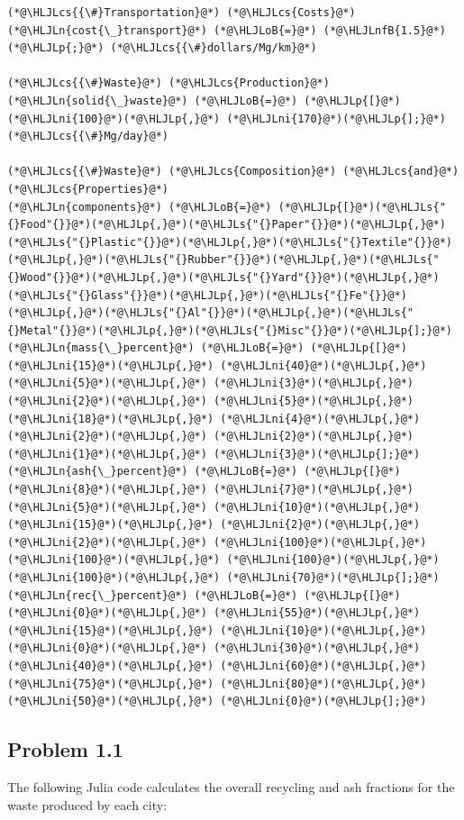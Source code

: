 \documentclass[12pt,a4paper]{article}
\newcommand{\HLJLn}[1]{#1}
\newcommand{\HLJLs}[1]{\textcolor[RGB]{201,61,57}{#1}}
\newcommand{\HLJLnfB}[1]{\textcolor[RGB]{59,151,46}{#1}}
\newcommand{\HLJLni}[1]{\textcolor[RGB]{59,151,46}{#1}}
\newcommand{\HLJLoB}[1]{\textcolor[RGB]{102,102,102}{\textbf{#1}}}
\newcommand{\HLJLp}[1]{#1}
\newcommand{\HLJLcs}[1]{\textcolor[RGB]{153,153,119}{\textit{#1}}}
\begin{document}
\begin{lstlisting}
(*@\HLJLcs{{\#}Transportation}@*) (*@\HLJLcs{Costs}@*)
(*@\HLJLn{cost{\_}transport}@*) (*@\HLJLoB{=}@*) (*@\HLJLnfB{1.5}@*)(*@\HLJLp{;}@*) (*@\HLJLcs{{\#}dollars/Mg/km}@*)

(*@\HLJLcs{{\#}Waste}@*) (*@\HLJLcs{Production}@*)
(*@\HLJLn{solid{\_}waste}@*) (*@\HLJLoB{=}@*) (*@\HLJLp{[}@*)(*@\HLJLni{100}@*)(*@\HLJLp{,}@*) (*@\HLJLni{170}@*)(*@\HLJLp{];}@*) (*@\HLJLcs{{\#}Mg/day}@*)

(*@\HLJLcs{{\#}Waste}@*) (*@\HLJLcs{Composition}@*) (*@\HLJLcs{and}@*) (*@\HLJLcs{Properties}@*)
(*@\HLJLn{components}@*) (*@\HLJLoB{=}@*) (*@\HLJLp{[}@*)(*@\HLJLs{"{}Food"{}}@*)(*@\HLJLp{,}@*)(*@\HLJLs{"{}Paper"{}}@*)(*@\HLJLp{,}@*)(*@\HLJLs{"{}Plastic"{}}@*)(*@\HLJLp{,}@*)(*@\HLJLs{"{}Textile"{}}@*)(*@\HLJLp{,}@*)(*@\HLJLs{"{}Rubber"{}}@*)(*@\HLJLp{,}@*)(*@\HLJLs{"{}Wood"{}}@*)(*@\HLJLp{,}@*)(*@\HLJLs{"{}Yard"{}}@*)(*@\HLJLp{,}@*)(*@\HLJLs{"{}Glass"{}}@*)(*@\HLJLp{,}@*)(*@\HLJLs{"{}Fe"{}}@*)(*@\HLJLp{,}@*)(*@\HLJLs{"{}Al"{}}@*)(*@\HLJLp{,}@*)(*@\HLJLs{"{}Metal"{}}@*)(*@\HLJLp{,}@*)(*@\HLJLs{"{}Misc"{}}@*)(*@\HLJLp{];}@*)
(*@\HLJLn{mass{\_}percent}@*) (*@\HLJLoB{=}@*) (*@\HLJLp{[}@*)(*@\HLJLni{15}@*)(*@\HLJLp{,}@*) (*@\HLJLni{40}@*)(*@\HLJLp{,}@*) (*@\HLJLni{5}@*)(*@\HLJLp{,}@*) (*@\HLJLni{3}@*)(*@\HLJLp{,}@*) (*@\HLJLni{2}@*)(*@\HLJLp{,}@*) (*@\HLJLni{5}@*)(*@\HLJLp{,}@*) (*@\HLJLni{18}@*)(*@\HLJLp{,}@*) (*@\HLJLni{4}@*)(*@\HLJLp{,}@*) (*@\HLJLni{2}@*)(*@\HLJLp{,}@*) (*@\HLJLni{2}@*)(*@\HLJLp{,}@*) (*@\HLJLni{1}@*)(*@\HLJLp{,}@*) (*@\HLJLni{3}@*)(*@\HLJLp{];}@*)
(*@\HLJLn{ash{\_}percent}@*) (*@\HLJLoB{=}@*) (*@\HLJLp{[}@*)(*@\HLJLni{8}@*)(*@\HLJLp{,}@*) (*@\HLJLni{7}@*)(*@\HLJLp{,}@*) (*@\HLJLni{5}@*)(*@\HLJLp{,}@*) (*@\HLJLni{10}@*)(*@\HLJLp{,}@*) (*@\HLJLni{15}@*)(*@\HLJLp{,}@*) (*@\HLJLni{2}@*)(*@\HLJLp{,}@*) (*@\HLJLni{2}@*)(*@\HLJLp{,}@*) (*@\HLJLni{100}@*)(*@\HLJLp{,}@*) (*@\HLJLni{100}@*)(*@\HLJLp{,}@*) (*@\HLJLni{100}@*)(*@\HLJLp{,}@*) (*@\HLJLni{100}@*)(*@\HLJLp{,}@*) (*@\HLJLni{70}@*)(*@\HLJLp{];}@*)
(*@\HLJLn{rec{\_}percent}@*) (*@\HLJLoB{=}@*) (*@\HLJLp{[}@*)(*@\HLJLni{0}@*)(*@\HLJLp{,}@*) (*@\HLJLni{55}@*)(*@\HLJLp{,}@*) (*@\HLJLni{15}@*)(*@\HLJLp{,}@*) (*@\HLJLni{10}@*)(*@\HLJLp{,}@*) (*@\HLJLni{0}@*)(*@\HLJLp{,}@*) (*@\HLJLni{30}@*)(*@\HLJLp{,}@*) (*@\HLJLni{40}@*)(*@\HLJLp{,}@*) (*@\HLJLni{60}@*)(*@\HLJLp{,}@*) (*@\HLJLni{75}@*)(*@\HLJLp{,}@*) (*@\HLJLni{80}@*)(*@\HLJLp{,}@*) (*@\HLJLni{50}@*)(*@\HLJLp{,}@*) (*@\HLJLni{0}@*)(*@\HLJLp{];}@*)
\end{lstlisting}


\subsection{Problem 1.1}
The following Julia code calculates the overall recycling and ash fractions for the waste produced by each city:
\end{document}
